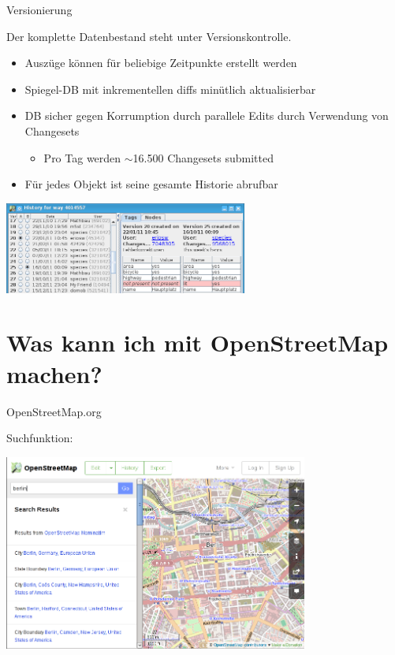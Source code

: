 \documentclass{beamer}
\begin{document}
\begin{frame}{Versionierung}

Der komplette Datenbestand steht unter Versionskontrolle.
\begin{itemize}
  \item Auszüge können für beliebige Zeitpunkte erstellt werden
  \item Spiegel-DB mit inkrementellen diffs minütlich aktualisierbar
  \item DB sicher gegen Korrumption durch parallele Edits durch Verwendung von Changesets
  \begin{itemize}
    \item Pro Tag werden $\sim$16.500 Changesets submitted
  \end{itemize}
  \item Für jedes Objekt ist seine gesamte Historie abrufbar
\end{itemize}

 \hfill \includegraphics[width=8cm]{history.png}


\end{frame}


\section{Was kann ich mit OpenStreetMap machen?}


\begin{frame}{OpenStreetMap.org}

	Suchfunktion:

	\includegraphics[width=10cm]{osm-org.png}

\end{frame}
\end{document}
